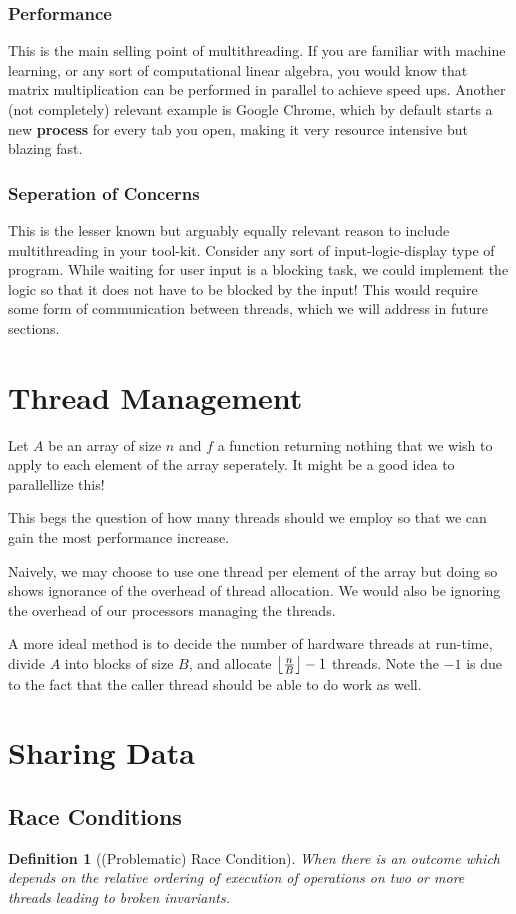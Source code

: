 \documentclass[10pt]{article}
\DeclarePairedDelimiter{\floor}{\lfloor}{\rfloor}
\theoremstyle{break}
\newtheorem{defn}{Definition}[subsection]
\begin{document}
\subsubsection{Performance}
This is the main selling point of multithreading.
If you are familiar with machine learning, or any sort of computational linear algebra, you would know that matrix multiplication can be performed in parallel to achieve speed ups.
Another (not completely) relevant example is Google Chrome, which by default starts a new \textbf{process} for every tab you open, making it very resource intensive but blazing fast.

\subsubsection{Seperation of Concerns}
This is the lesser known but arguably equally relevant reason to include multithreading in your tool-kit.
Consider any sort of input-logic-display type of program.
While waiting for user input is a blocking task, we could implement the logic so that it does not have to be blocked by the input!
This would require some form of communication between threads, which we will address in future sections.


\newpage
\section{Thread Management}
Let $A$ be an array of size $n$ and $f$ a function returning nothing that we wish to apply to each element of the array seperately.
It might be a good idea to parallellize this!

This begs the question of how many threads should we employ so that we can gain the most performance increase.

Naively, we may choose to use one thread per element of the array but doing so shows ignorance of the overhead of thread allocation.
We would also be ignoring the overhead of our processors managing the threads.

A more ideal method is to decide the number of hardware threads at run-time, divide $A$ into blocks of size $B$, and allocate $\floor*{\frac{n}{B}}-1$ threads.
Note the $-1$ is due to the fact that the caller thread should be able to do work as well.


\newpage
\section{Sharing Data}
\subsection{Race Conditions}
\begin{defn}[(Problematic) Race Condition]
    When there is an outcome which depends on the relative ordering of execution of operations on two or more threads leading to broken invariants.
\end{defn}
\end{document}
